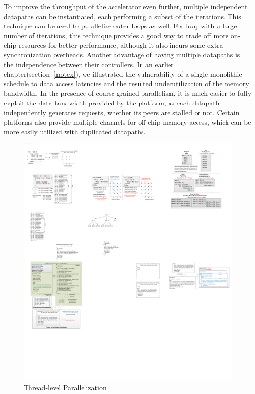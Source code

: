 To improve the throughput of the accelerator even further, multiple
independent datapaths can be instantiated, each performing a subset of 
the iterations. This technique can be used to parallelize outer loops
as well. For loop with a large number of iterations, this technique provides a good way to trade off more on-chip resources for better performance, although
it also incurs some extra synchronization overheads. Another advantage of
having multiple datapaths is the independence between their controllers.
In an earlier chapter(section~\ref{motex}), we illustrated the vulnerability
of a single monolithic schedule to data access latencies and the resulted
underutilization of the memory bandwidth. In the presence of coarse grained parallelism, it is much easier to fully exploit the data bandwidth provided
by the platform, as each datapath independently generates requests, whether
its peers are stalled or not. 
Certain platforms also provide multiple channels
for off-chip memory access, which can be more easily utilized with duplicated datapaths. 


\begin{figure}[htp]
\begin{center}
\includegraphics[width=1.1\linewidth]{chap6fig/threadSplit.pdf}
\caption{Thread-level Parallelization 
\label{fig:threadP}}
\end{center}
\end{figure}

